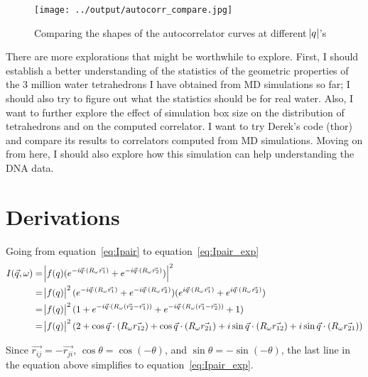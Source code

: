 \documentclass[20pt]{article}
\begin{document}
\begin{figure}[!h]
  \centering
    \texttt{[image: ../output/autocorr\_compare.jpg]}
     \caption{Comparing the shapes of the autocorrelator curves at different $\abs{q}$'s} \label{fig:autocorr_compare}
\end{figure}

There are more explorations that might be worthwhile to explore. First, I should establish a better understanding of the statistics of the geometric properties of the 3 million water tetrahedrons I have obtained from MD simulations so far; I should also try to figure out what the statistics should be for real water. Also, I want to further explore the effect of simulation box size on the distribution of tetrahedrons and on the computed correlator. I want to try Derek's code (thor) and compare its results to correlators computed from MD simulations. Moving on from here, I should also explore how this simulation can help understanding the DNA data.

\section{Derivations}
Going from equation~\ref{eq:Ipair} to equation~\ref{eq:Ipair_exp}
\begin{align}
I(\vec{q},\omega) &= \abs{f(q) (e^{-i \vec{q} \cdot (R_{\omega} \vec{r_1})}+e^{-i \vec{q} \cdot (R_{\omega} \vec{r_2})})}^2 \nonumber \\ 
&=\abs{f(q)}^2 (e^{-i \vec{q} \cdot (R_{\omega} \vec{r_1})}+e^{-i \vec{q} \cdot (R_{\omega} \vec{r_2})})(e^{i \vec{q} \cdot (R_{\omega} \vec{r_1})}+e^{i \vec{q} \cdot (R_{\omega} \vec{r_2})}) \nonumber\\
&=\abs{f(q)}^2(1+e^{-i \vec{q} \cdot (R_{\omega} (\vec{r_2}-\vec{r_1}))}+e^{-i \vec{q} \cdot (R_{\omega} (\vec{r_1}-\vec{r_2}))}+1)\nonumber \\
&=\abs{f(q)}^2(2+\cos{\vec{q} \cdot (R_{\omega} \vec{r_{12}}})+\cos{\vec{q} \cdot (R_{\omega} \vec{r_{21}}})+i\sin{\vec{q} \cdot (R_{\omega} \vec{r_{12}}})+i\sin{\vec{q} \cdot (R_{\omega} \vec{r_{21}}})) \nonumber
\end{align}

Since $\vec{r_{ij}} = -\vec{r_{ji}}$, $\cos{\theta}=\cos{(-\theta)}$, and $\sin{\theta}=-\sin{(-\theta)}$, the last line in the equation above simplifies to equation~\ref{eq:Ipair_exp}.
\end{document}
